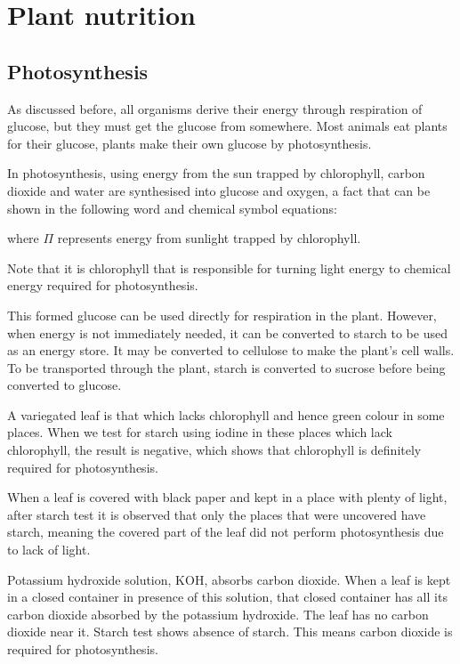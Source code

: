 \section{Plant nutrition}
\subsection{Photosynthesis}

As discussed before, all organisms derive their energy through respiration of glucose, but they
must get the glucose from somewhere. Most animals eat plants for their glucose, plants make their
own glucose by photosynthesis.

In photosynthesis, using energy from the sun trapped by chlorophyll, carbon dioxide and water are
synthesised into glucose and oxygen, a fact that can be shown in the following word and chemical
symbol equations:
\begin{center}

\end{center}
where $\Pi$ represents energy from sunlight trapped by chlorophyll.

Note that it is chlorophyll that is responsible for turning light energy to chemical energy 
required for photosynthesis.

This formed glucose can be used directly for respiration in the plant. However, when energy is not
immediately needed, it can be converted to starch to be used as an energy store. It may be 
converted to cellulose to make the plant's cell walls. To be transported through the plant, starch
is converted to sucrose before being converted to glucose.

A variegated leaf is that which lacks chlorophyll and hence green colour in some places. When we
test for starch using iodine in these places which lack chlorophyll, the result is negative, which
shows that chlorophyll is definitely required for photosynthesis.

When a leaf is covered with black paper and kept in a place with plenty of light, after starch
test it is observed that only the places that were uncovered have starch, meaning the covered
part of the leaf did not perform photosynthesis due to lack of light.

Potassium hydroxide solution, KOH, absorbs carbon dioxide. When a leaf is kept in a closed 
container in presence of this solution, that closed container has all its carbon dioxide absorbed
by the potassium hydroxide. The leaf has no carbon dioxide near it. Starch test shows absence of
starch. This means carbon dioxide is required for photosynthesis.

